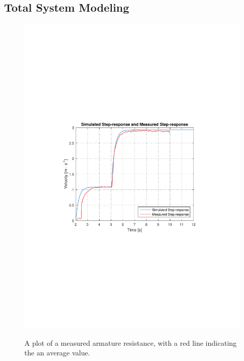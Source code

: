 \subsection{Total System Modeling}

\begin{figure}[H]
  \centering
  {
    \includegraphics[width=1.2\textwidth]{figures/VelocityStepResponseIRLandSimulation.pdf}
  }
  \caption{A plot of a measured armature resistance, with a red line indicating the an average value.}
  \label{armatureResistance}
\end{figure}